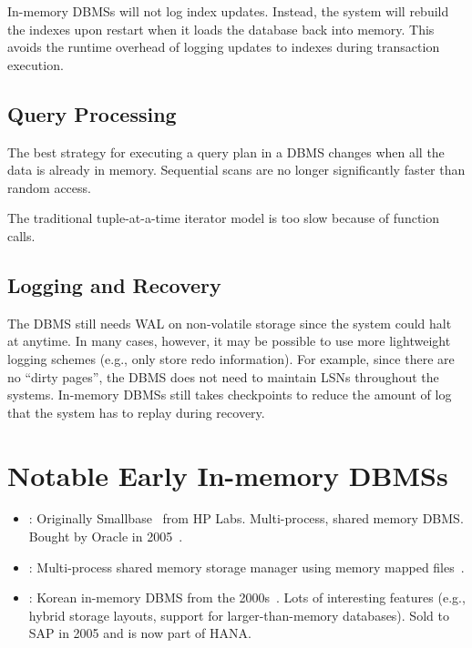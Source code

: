 \documentclass[11pt]{article}
\begin{document}
In-memory DBMSs will not log index updates. Instead, the system will rebuild the indexes upon 
restart when it loads the database back into memory. This avoids the runtime overhead of 
logging updates to indexes during transaction execution.
    
\subsection*{Query Processing}
The best strategy for executing a query plan in a DBMS changes when all the data is 
already in memory. Sequential scans are no longer significantly faster than random access.
        
The traditional tuple-at-a-time iterator model is too slow because of function calls.
    
\subsection*{Logging and Recovery}
The DBMS still needs WAL on non-volatile storage since the system could halt at anytime.
In many cases, however, it may be possible to use more lightweight logging schemes (e.g., only 
store 
redo information). For example, since there are no ``dirty pages'', the DBMS does not need to 
maintain LSNs throughout the systems.
%         
In-memory DBMSs still takes checkpoints to reduce the amount of log that the system has to replay 
during recovery.
    
 
\section{Notable Early In-memory DBMSs}
\begin{itemize}
    \item {}:
    Originally Smallbase~\cite{heytens95} from HP Labs.
    Multi-process, shared memory DBMS.
    Bought by Oracle in 2005~\cite{lahiri13}.

    \item {}:
    Multi-process shared memory storage manager using memory mapped files~\cite{jagadish94}.
        
    \item {}:
    Korean in-memory DBMS from the 2000s~\cite{cha04}.
    Lots of interesting features (e.g., hybrid storage layouts, support for larger-than-memory 
    databases). Sold to SAP in 2005 and is now part of HANA.
\end{itemize}

\newpage


\end{document}
